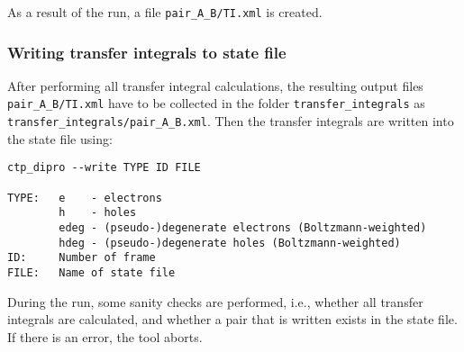 As a result of the run, a file {\tt pair\_A\_B/TI.xml} is created. 

\subsubsection{Writing transfer integrals to state file}
After performing all transfer integral calculations, the resulting output files {\tt pair\_A\_B/TI.xml} have to be collected in the folder {\tt transfer\_integrals} as {\tt transfer\_integrals/pair\_A\_B.xml}. Then the transfer integrals are written into the state file using:
\begin{verbatim}
ctp_dipro --write TYPE ID FILE

TYPE:   e    - electrons
        h    - holes
        edeg - (pseudo-)degenerate electrons (Boltzmann-weighted)
        hdeg - (pseudo-)degenerate holes (Boltzmann-weighted)
ID:     Number of frame
FILE:   Name of state file 
\end{verbatim}
During the run, some sanity checks are performed, i.e., whether all transfer integrals are calculated, and whether a pair that is written exists in the state file. If there is an error, the tool aborts.
